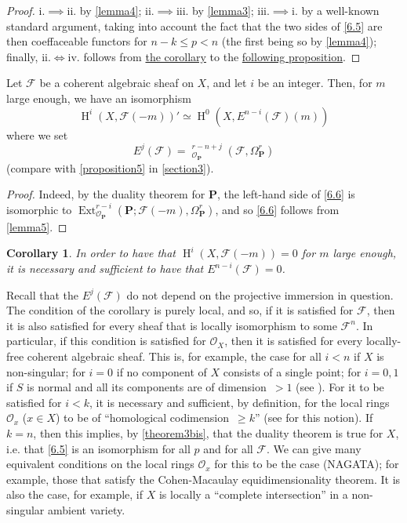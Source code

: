 \documentclass{article}
\theoremstyle{plain}
\newenvironment{proposition}[1]
  {\renewcommand\theinnercustomproposition{#1}\innercustomproposition}
  {\endinnercustomproposition}
\newtheorem*{corollary*}{Corollary}
\theoremstyle{definition}
\newcommand{\sh}[1]{{\mathscr{#1}}}
\newcommand{\bb}{\mathbf}
\renewcommand{\geq}{\geqslant}
\renewcommand{\leq}{\leqslant}
\DeclareMathOperator{\Ext}{Ext}
\DeclareMathOperator{\shExt}{\underline{Ext}}
\DeclareMathOperator{\HH}{H}
\newcommand{\oldpage}[1]{\marginpar{\footnotesize$\Big\vert$ \textit{p.~#1}}}
\begin{document}
\begin{proof}
  i.$\implies$ii. by \cref{lemma4};
  ii.$\implies$iii. by \cref{lemma3};
  iii.$\implies$i. by a well-known standard argument, taking into account the fact that the two sides of \cref{6.5} are then coeffaceable functors for $n-k\leq p< n$ (the first being so by \cref{lemma4});
  finally, ii.$\iff$iv. follows from \hyperref[proposition6corollary]{the corollary} to the \hyperref[proposition6]{following proposition}.
\end{proof}

\begin{proposition}{6}
\label{proposition6}
  Let $\sh{F}$ be a coherent algebraic sheaf on $X$, and let $i$ be an integer.
  Then, for $m$ large enough, we have an isomorphism
  \[
  \label{6.6}
    \HH^i(X,\sh{F}(-m))' \simeq \HH^0(X,E^{n-i}(\sh{F})(m))
  \tag{6.6}
  \]
  where we set
  \[
  \label{6.7}
    E^j(\sh{F}) = \shExt_{\sh{O}_\bb{P}}^{r-n+j}(\sh{F},\Omega_\bb{P}^r)
  \tag{6.7}
  \]
  (compare with \cref{proposition5} in \cref{section3}).
\end{proposition}

\begin{proof}
  Indeed, by the duality theorem for $\bb{P}$, the left-hand side of \cref{6.6} is isomorphic to $\Ext_{\sh{O}_\bb{P}}^{r-i}(\bb{P};\sh{F}(-m),\Omega_\bb{P}^r)$, and so \cref{6.6} follows from \cref{lemma5}.
\end{proof}

\oldpage{149-19}
\begin{corollary*}
\label{proposition6corollary}
  In order to have that $\HH^i(X,\sh{F}(-m))=0$ for $m$ large enough, it is necessary and sufficient to have that $E^{n-i}(\sh{F})=0$.
\end{corollary*}

Recall that the $E^j(\sh{F})$ do not depend on the projective immersion in question.
The condition of the corollary is purely local, and so, if it is satisfied for $\sh{F}$, then it is also satisfied for every sheaf that is locally isomorphism to some $\sh{F}^n$.
In particular, if this condition is satisfied for $\sh{O}_X$, then it is satisfied for every locally-free coherent algebraic sheaf.
This is, for example, the case for all $i<n$ if $X$ is non-singular; for $i=0$ if no component of $X$ consists of a single point; for $i=0,1$ if $S$ is normal and all its components are of dimension~$>1$ (see \cite{3}).
For it to be satisfied for $i<k$, it is necessary and sufficient, by definition, for the local rings $\sh{O}_x$ ($x\in X$) to be of ``homological codimension~$\geq k$'' (see \cite{4} for this notion).
If $k=n$, then this implies, by \cref{theorem3bis}, that the duality theorem is true for $X$, i.e. that \cref{6.5} is an isomorphism for all $p$ and for all $\sh{F}$.
We can give many equivalent conditions on the local rings $\sh{O}_x$ for this to be the case (NAGATA);
for example, those that satisfy the Cohen-Macaulay equidimensionality theorem.
It is also the case, for example, if $X$ is locally a ``complete intersection'' in a non-singular ambient variety.
\end{document}
